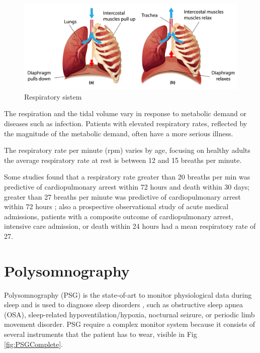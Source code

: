 \vspace{0.6cm}
\begin{figure}[H]
    \centering
    \includegraphics[width=\textwidth]{img/j338_ps1n_201111.png}
    \caption{Respiratory sistem}
    \label{fig:resp}
\end{figure}
\vspace{0.7cm}


The respiration and the tidal volume vary in response to metabolic demand or diseases such as infection. Patients with elevated respiratory rates, reflected by the magnitude of the metabolic demand, often have a more serious illness. 

The respiratory rate per minute (rpm) varies by age, focusing on healthy adults the average respiratory rate at rest is between 12 and 15 breaths per minute\cite{barrett2010ganong}.

Some studies found that a respiratory rate greater than 20 breaths per min was predictive of cardiopulmonary arrest within 72 hours and death within 30 days\cite{Hong2013HowPatients}; greater than 27 breaths per minute was predictive of cardiopulmonary arrest within 72 hours \cite{Fieselmann1993RespiratoryInpatients}; also a prospective observational study of acute medical admissions, patients with a composite outcome of cardiopulmonary arrest, intensive care admission, or death within 24 hours had a mean respiratory rate of 27\cite{Subbe2003EffectAdmissions}.

\section{Polysomnography} \label{cap:POLYSOMNOGRAPHY}

Polysomnography (PSG) is the state-of-art to monitor physiological data during sleep and is used to diagnose sleep disorders \cite{Penzel2016ModulationsPolysomnography, RUNDO2019381}, such as obstructive sleep apnea (OSA), sleep-related hypoventilation/hypoxia, nocturnal seizure, or periodic limb movement disorder. PSG require a complex monitor system because it consists of several instruments that the patient has to wear, visible in Fig \ref{fig:PSGComplete}.

